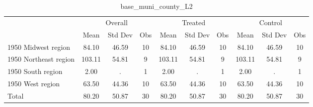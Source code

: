 \begin{table}[htbp]\centering
\def\sym#1{\ifmmode^{#1}\else\(^{#1}\)\fi}
\caption{base\_muni\_county\_L2 \label{tab1}}
\begin{tabular}{l*{3}{ccc}}
\toprule
                    &\multicolumn{3}{c}{Overall}           &\multicolumn{3}{c}{Treated}           &\multicolumn{3}{c}{Control}           \\
                    &        Mean&     Std Dev&         Obs&        Mean&     Std Dev&         Obs&        Mean&     Std Dev&         Obs\\
\midrule
1950 Midwest region &       84.10&       46.59&          10&       84.10&       46.59&          10&       84.10&       46.59&          10\\
1950 Northeast region&      103.11&       54.81&           9&      103.11&       54.81&           9&      103.11&       54.81&           9\\
1950 South region   &        2.00&           .&           1&        2.00&           .&           1&        2.00&           .&           1\\
1950 West region    &       63.50&       44.36&          10&       63.50&       44.36&          10&       63.50&       44.36&          10\\
Total               &       80.20&       50.87&          30&       80.20&       50.87&          30&       80.20&       50.87&          30\\
\bottomrule
\end{tabular}
\end{table}
